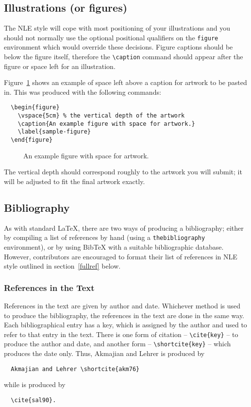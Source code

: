 \documentclass{nle}
\begin{document}
\subsection{Illustrations (or figures)}

The NLE style will cope with most positioning of your illustrations
and you should not normally use the optional positional qualifiers on
the \verb"figure" environment which would override these decisions.
Figure captions should be below the figure itself, therefore the \verb"\caption"
command should appear after the figure or space left for an illustration.

Figure~\ref{sample-figure} shows an example of space left above a
caption for artwork to be pasted in. This was produced with the
following commands:
%
\begin{verbatim}
  \begin{figure}
    \vspace{5cm} % the vertical depth of the artwork
    \caption{An example figure with space for artwork.}
    \label{sample-figure}
  \end{figure}
\end{verbatim}
%
\begin{figure}
  \vspace{5cm} %
  \caption{An example figure with space for artwork.}
  \label{sample-figure}
\end{figure}
%
The vertical depth should correspond roughly to the artwork you will submit;
it will be adjusted to fit the final artwork exactly.

\subsection{Bibliography}

As with standard \LaTeX, there are two ways of producing a bibliography;
either by compiling a list of references by hand (using a
\verb"thebibliography" environment), or by using BibTeX with a suitable
bibliographic database. However, contributors are encouraged to format
their list of references in NLE style outlined in section~\ref{fullref}
below.

\subsubsection{References in the Text}

References in the text are given by author and date.
Whichever method is used to produce the bibliography, the references in
the text are done in the same way. Each bibliographical entry has a key,
which is assigned by the author and used to refer to that entry in the
text. There is one form of citation -- \verb"\cite{key}" -- to produce the
author and date, and another form -- \verb"\shortcite{key}" -- which
produces the date only. Thus,
Akmajian and Lehrer  is produced by
%
\begin{verbatim}
  Akmajian and Lehrer \shortcite{akm76}
\end{verbatim}
%
while \cite{sal90} is produced by
%
\begin{verbatim}
  \cite{sal90}.
\end{verbatim}
\end{document}
